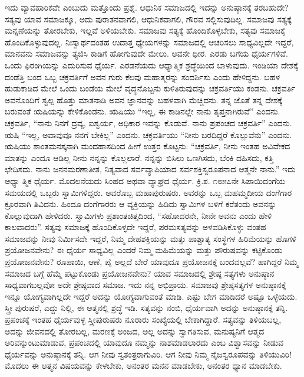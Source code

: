 ಇದು ವ್ಯಾವಹಾರಿಕವೇ ಎಂಬುದು ಮತ್ತೊಂದು ಪ್ರಶ್ನೆ. ಆಧುನಿಕ ಸಮಾಜದಲ್ಲಿ ಇದನ್ನು ಅನುಷ್ಠಾನಕ್ಕೆ ತರಬಹುದೇ? ಸತ್ಯವು ಯಾವ ಸಮಾಜಕ್ಕೂ, ಅದು ಪುರಾತನವಾಗಲಿ, ಆಧುನಿಕವಾಗಲಿ, ಗೌರವ ಸಲ್ಲಿಸುವುದಿಲ್ಲ. ಸಮಾಜವು ಸತ್ಯಕ್ಕೆ ಮನ್ನಣೆಯನ್ನು ತೋರಬೇಕು, ಇಲ್ಲವೆ ಅಳಿಯಬೇಕು. ಸಮಾಜವು ಸತ್ಯಕ್ಕೆ ಹೊಂದಿಕೊಳ್ಳಬೇಕು, ಸತ್ಯವು ಸಮಾಜಕ್ಕೆ ಹೊಂದಿಕೊಳ್ಳುವುದಲ್ಲ. ನಿಃಸ್ವಾರ್ಥದಂತಹ ಉದಾತ್ತ ಧ್ಯೇಯಗಳನ್ನು ಸಮಾಜದಲ್ಲಿ ಆಚರಿಸಲು ಸಾಧ್ಯವಿಲ್ಲದೇ ಇದ್ದರೆ, ಮಾನವನು ಸಮಾಜವನ್ನು ತ್ಯಜಿಸಿ ಕಾಡಿಗೆ ಹೋಗುವುದೇ ಮೇಲು. ಅವನೇ ಧೀರ. ಎರಡು ಬಗೆಯ ಧೈರ್ಯಗಳಿವೆ. ಒಂದು ಫಿರಂಗಿಯನ್ನು ಎದುರಿಸುವ ಧೈರ್ಯ. ಎರಡನೆಯದು ಆಧ್ಯಾತ್ಮಿಕ ಶ್ರದ್ಧೆಯಿಂದ ಬಾಳುವುದು. ಇಂಡಿಯಾ ದೇಶಕ್ಕೆ ದಂಡೆತ್ತಿ ಬಂದ ಒಬ್ಬ ಚಕ್ರವರ್ತಿಗೆ ಅವನ ಗುರು ಕೆಲವು ಮಹಾತ್ಮರನ್ನು ಸಂದರ್ಶಿಸು ಎಂದು ಹೇಳಿದ್ದನು. ಬಹಳ ಹುಡುಕಾಡಿದ ಮೇಲೆ ಒಂದು ಬಂಡೆಯ ಮೇಲೆ ವೃದ್ಧನೊಬ್ಬನು ಕುಳಿತಿರುವುದನ್ನು ಚಕ್ರವರ್ತಿಯು ಕಂಡನು. ಚಕ್ರವರ್ತಿ ಅವನೊಂದಿಗೆ ಸ್ವಲ್ಪ ಹೊತ್ತು ಮಾತನಾಡಿ ಅವನ ಜ್ಞಾನವನ್ನು ಬಹಳವಾಗಿ ಮೆಚ್ಚಿದನು. ತನ್ನ ಜೊತೆ ತನ್ನ ದೇಶಕ್ಕೆ ಬರುವಂತೆ ಋಷಿಯನ್ನು ಕೇಳಿಕೊಂಡನು. ಋಷಿಯು “ಇಲ್ಲ, ಈ ಕಾಡಿನಲ್ಲೇ ನಾನು ತೃಪ್ತನಾಗಿರುವೆ” ಎಂದನು. ಚಕ್ರವರ್ತಿ, “ನಾನು ನಿನಗೆ ದ್ರವ್ಯ, ಐಶ್ವರ್ಯ, ಅಧಿಕಾರ ಇವನ್ನು ಕೊಡುವೆ. ನಾನು ಪ್ರಪಂಚದ ಚಕ್ರವರ್ತಿ” ಎಂದನು. ಋಷಿ “ಇಲ್ಲ, ಅವಾವುವೂ ನನಗೆ ಬೇಕಿಲ್ಲ” ಎಂದನು. ಚಕ್ರವರ್ತಿಯು “ನೀನು ಬರದಿದ್ದರೆ ಕೊಲ್ಲುವೆನು” ಎಂದನು. ಋಷಿಯು ಶಾಂತಮನಸ್ಕನಾಗಿ ಮಂದಹಾಸದಿಂದ ಹೀಗೆ ಉತ್ತರ ಕೊಟ್ಟನು: “ಚಕ್ರವರ್ತಿ, ನೀನು ಇಂತಹ ಅವಿವೇಕದ ಮಾತನ್ನು ಎಂದೂ ಆಡಿಲ್ಲ ನೀನು ನನ್ನನ್ನು ಕೊಲ್ಲಲಾರೆ. ನನ್ನನ್ನು ಬಿಸಿಲು ಒಣಗಿಸದು, ಬೆಂಕಿ ದಹಿಸದು, ಕತ್ತಿ ಛೇದಿಸದು. ನಾನು ಜನನಮರಣಾತೀತ, ನಿತ್ಯವಾದ ಸರ್ವವ್ಯಾಪಿಯಾದ ಸರ್ವಶಕ್ತಿಸ್ವರೂಪನಾದ ಆತ್ಮನೇ ನಾನು.” ಇದು ಆಧ್ಯಾ ತ್ಮಿಕ ಧೈರ್ಯ. ಮೊದಲನೆಯದು ಸಿಂಹದ ಅಥವಾ ವ್ಯಾಘ್ರದ ಧೈರ್ಯ. ಕ್ರಿ.ಶ. ೧೮೫೭ನೇ ಸಿಪಾಯಿದಂಗೆಯ ಸಮಯದಲ್ಲಿ ಒಬ್ಬರು ಸ್ವಾಮಿಗಳಿದ್ದರು. ಅವರೊಬ್ಬ ಮಹಾಪುರುಷರು. ಅವರನ್ನು ಒಬ್ಬ ಮಹಮ್ಮದೀಯ ದಂಗೆಗಾರ ಕ್ರೂರವಾಗಿ ತಿವಿದನು. ಹಿಂದೂ ದಂಗೆಗಾರರು ಆ ವ್ಯಕ್ತಿಯನ್ನು ಹಿಡಿದು ಸ್ವಾಮಿಗಳ ಬಳಿಗೆ ಕರೆತಂದು ಅವನನ್ನು ಕೊಲ್ಲುವುದಾಗಿ ಹೇಳಿದರು. ಸ್ವಾಮಿಗಳು ಪ್ರಶಾಂತಚಿತ್ತದಿಂದ, “ಸಹೋದರನೇ, ನೀನೇ ಅವನು ಎಂದು ಹೇಳಿ ಕಾಲವಾದರು”. ಸತ್ಯವು ಸಮಾಜಕ್ಕೆ ಹೊಂದಿಕೊಳ್ಳದೇ ಇದ್ದರೆ, ಪರಮಸತ್ಯವನ್ನು ಅಳವಡಿಸಿಕೊಳ್ಳು ವಂತಹ ಸಮಾಜವನ್ನು ನೀವು ನಿರ್ಮಿಸದೇ ಇದ್ದರೆ, ನಿಮ್ಮ ದೇಹಶಕ್ತಿಯನ್ನು ಮತ್ತು ಪಾಶ್ಚಾತ್ಯ ಸಂಸ್ಥೆಗಳ ಹಿರಿಮೆಯನ್ನು ಹೊಗಳಿ ಪ್ರಯೋಜನವೇನು? ಈ ಧೈರ್ಯ ಸಾಧ್ಯವಿಲ್ಲ ಎಂದರೆ ನಿಮ್ಮ ಮಹಿಮೆಯನ್ನು ಮತ್ತು ಪೌರುಷವನ್ನು ಕಟ್ಟಿಕೊಂಡು ಪ್ರಯೋಜನವೇನು? ರೂಪಾಯಿ, ಆಣೆ, ಪೈ ಅಲ್ಲದೆ ಬೇರೆ ಯಾವುದೂ ಪ್ರಯೋಜನಕ್ಕೆ ಬಂದವಲ್ಲವೆ? ಹಾಗಿದ್ದರೆ ನಿಮ್ಮ ಸಮಾಜದ ಬಗ್ಗೆ ಹೆಮ್ಮೆ ಪಟ್ಟುಕೊಂಡು ಪ್ರಯೋಜನವೇನು? ಯಾವ ಸಮಾಜದಲ್ಲಿ ಶ್ರೇಷ್ಠ ಸತ್ಯಗಳು ಅನುಷ್ಠಾನ ಸಾಧ್ಯವಾಗಬಲ್ಲವೋ ಅದೇ ಶ್ರೇಷ್ಠವಾದ ಸಮಾಜ. ಇದು ನನ್ನ ಅಭಿಪ್ರಾಯ. ಸಮಾಜವು ಶ್ರೇಷ್ಠಸತ್ಯಗಳ ಅನುಷ್ಠಾನಕ್ಕೆ ಇನ್ನೂ ಯೋಗ್ಯವಾಗಿಲ್ಲದೇ ಇದ್ದರೆ ಅದನ್ನು ಯೋಗ್ಯವಾಗುವಂತೆ ಮಾಡಿ. ಎಷ್ಟು ಬೇಗ ಮಾಡಿದರೆ ಅಷ್ಟೂ ಒಳ್ಳೆಯದು. ಸ್ತ್ರೀ ಪುರುಷರೆ, ಎದ್ದು ನಿಲ್ಲಿ, ಈ ಆತ್ಮನಲ್ಲಿ ಶ್ರದ್ಧೆ ಇಡಿ. ಸತ್ಯವನ್ನು ನಂಬಿ, ಧೈರ್ಯವಾಗಿ ಅದನ್ನು ಅನುಷ್ಠಾನಕ್ಕೆ ತನ್ನಿ. ಪ್ರಪಂಚಕ್ಕೆ ಇಂತಹ ಧೈರ್ಯವುಳ್ಳ ಸ್ತ್ರೀಪುರುಷರು ನೂರಾರು ಸಂಖ್ಯೆಯಲ್ಲಿ ಬೇಕಾಗಿದ್ದಾರೆ. ಸತ್ಯವನ್ನು ತಿಳಿಯಬಲ್ಲ, ಅದನ್ನು ಜೀವನದಲ್ಲಿ ತೋರಬಲ್ಲ, ಮರಣಕ್ಕೆ ಅಂಜದ, ಅಲ್ಲ ಅದನ್ನು ಸ್ವಾಗತಿಸುವ, ಮನುಷ್ಯನಿಗೆ ಆತ್ಮದ ಅರಿವನ್ನುಂಟುಮಾಡುವ, ಪ್ರಪಂಚದಲ್ಲಿ ಯಾವುದೂ ನಮ್ಮನ್ನು ನಾಶಮಾಡಲಾರದು ಎಂಬ ವಿಶ್ವಾಸವನ್ನು ನೀಡುವ ಧೈರ್ಯವನ್ನು ಅನುಷ್ಠಾನಕ್ಕೆ ತನ್ನಿ. ಆಗ ನೀವು ಸ್ವತಂತ್ರರಾಗುವಿರಿ. ಆಗ ನೀವು ನಿಮ್ಮ ನೈಜಸ್ವರೂಪವನ್ನು ತಿಳಿಯುವಿರಿ! ಮೊದಲು ಈ ಆತ್ಮನ ವಿಷಯವನ್ನು ಕೇಳಬೇಕು, ಅನಂತರ ಮನನ ಮಾಡಬೇಕು, ಅನಂತರ ಧ್ಯಾನ ಮಾಡಬೇಕು.

